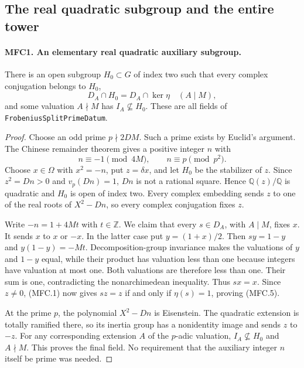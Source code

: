 \subsection{The real quadratic subgroup and the entire tower}

\paragraph{MFC1. An elementary real quadratic auxiliary subgroup.}
\label{claim:MFC1}
There is an open subgroup \(H_0\subset G\) of index two such that
every complex conjugation belongs to \(H_0\),
\[
 D_A\cap H_0=D_A\cap\ker\eta\quad(A\mid M),                \tag{MFC.5}
\]
and some valuation \(A\nmid M\) has \(I_A\not\subseteq H_0\).
These are all fields of \texttt{FrobeniusSplitPrimeDatum}.

\begin{proof}
Choose an odd prime \(p\nmid2DM\).  Such a prime exists by
Euclid's argument.  The Chinese remainder theorem gives a positive
integer \(n\) with
\[
                  n\equiv-1\pmod{4M},\qquad
                  n\equiv p\pmod{p^2}.                    \tag{MFC.6}
\]
Choose \(x\in\Omega\) with \(x^2=-n\), put \(z=\delta x\),
and let \(H_0\) be the stabilizer of \(z\).  Since
\(z^2=Dn>0\) and \(v_p(Dn)=1\), \(Dn\) is not a rational
square.  Hence \(\mathbb Q(z)/\mathbb Q\) is quadratic and
\(H_0\) is open of index two.  Every complex embedding sends
\(z\) to one of the real roots of \(X^2-Dn\), so every complex
conjugation fixes \(z\).

Write \(-n=1+4Mt\) with \(t\in\mathbb Z\).  We claim that
every \(s\in D_A\), with \(A\mid M\), fixes \(x\).
It sends \(x\) to \(x\) or \(-x\).  In the latter case put
\(y=(1+x)/2\).  Then \(sy=1-y\) and
\(y(1-y)=-Mt\).  Decomposition-group invariance makes the
valuations of \(y\) and \(1-y\) equal, while their product
has valuation less than one because integers have valuation at
most one.  Both valuations are therefore less than one.
Their sum is one, contradicting the nonarchimedean inequality.
Thus \(sx=x\).  Since \(z\ne0\), (MFC.1) now gives
\(sz=z\) if and only if \(\eta(s)=1\), proving (MFC.5).

At the prime \(p\), the polynomial \(X^2-Dn\) is Eisenstein.
The quadratic extension is totally ramified there, so its inertia
group has a nonidentity image and sends \(z\) to \(-z\).
For any corresponding extension \(A\) of the \(p\)-adic
valuation, \(I_A\not\subseteq H_0\) and \(A\nmid M\).
This proves the final field.  No requirement that the auxiliary
integer \(n\) itself be prime was needed.
\end{proof}

